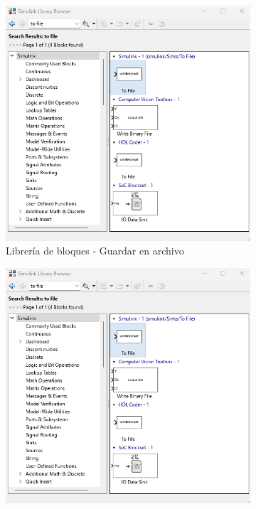 \begin{figure}[htbp]
    \centering
    \begin{subfigure}[b]{0.35\textwidth}
        \centering
        \includegraphics[width=\textwidth]{fig/Capitulo5/Caso_de_estudio_IMU/Generador_de_archivos/libreria_de_bloques_to_file.png}
        \caption{Librería de bloques - Guardar en archivo}
        \label{fig:lib_bloques_to_file_IMU}
    \end{subfigure}
    \hfill
    \begin{subfigure}[b]{0.45\textwidth}
        \centering
        \includegraphics[width=\textwidth]{fig/Capitulo5/Caso_de_estudio_IMU/Generador_de_archivos/libreria_de_bloques_to_file.png}

\end{subfigure}
\end{figure}
